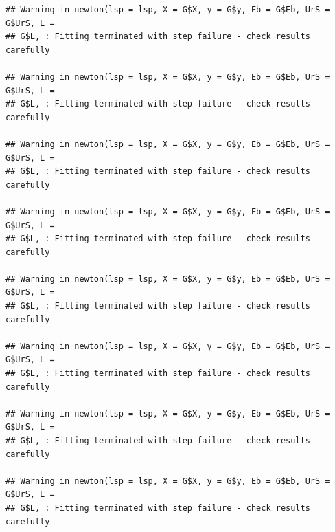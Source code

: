 \documentclass[]{book}
\newenvironment{Shaded}{\begin{snugshade}}{\end{snugshade}}
\newcommand{\KeywordTok}[1]{\textcolor[rgb]{0.13,0.29,0.53}{\textbf{#1}}}
\newcommand{\DataTypeTok}[1]{\textcolor[rgb]{0.13,0.29,0.53}{#1}}
\newcommand{\DecValTok}[1]{\textcolor[rgb]{0.00,0.00,0.81}{#1}}
\newcommand{\StringTok}[1]{\textcolor[rgb]{0.31,0.60,0.02}{#1}}
\newcommand{\OtherTok}[1]{\textcolor[rgb]{0.56,0.35,0.01}{#1}}
\newcommand{\OperatorTok}[1]{\textcolor[rgb]{0.81,0.36,0.00}{\textbf{#1}}}
\newcommand{\NormalTok}[1]{#1}
\theoremstyle{definition}
\theoremstyle{definition}
\theoremstyle{remark}
\begin{document}
\begin{verbatim}
## Warning in newton(lsp = lsp, X = G$X, y = G$y, Eb = G$Eb, UrS = G$UrS, L =
## G$L, : Fitting terminated with step failure - check results carefully

## Warning in newton(lsp = lsp, X = G$X, y = G$y, Eb = G$Eb, UrS = G$UrS, L =
## G$L, : Fitting terminated with step failure - check results carefully

## Warning in newton(lsp = lsp, X = G$X, y = G$y, Eb = G$Eb, UrS = G$UrS, L =
## G$L, : Fitting terminated with step failure - check results carefully

## Warning in newton(lsp = lsp, X = G$X, y = G$y, Eb = G$Eb, UrS = G$UrS, L =
## G$L, : Fitting terminated with step failure - check results carefully

## Warning in newton(lsp = lsp, X = G$X, y = G$y, Eb = G$Eb, UrS = G$UrS, L =
## G$L, : Fitting terminated with step failure - check results carefully

## Warning in newton(lsp = lsp, X = G$X, y = G$y, Eb = G$Eb, UrS = G$UrS, L =
## G$L, : Fitting terminated with step failure - check results carefully

## Warning in newton(lsp = lsp, X = G$X, y = G$y, Eb = G$Eb, UrS = G$UrS, L =
## G$L, : Fitting terminated with step failure - check results carefully

## Warning in newton(lsp = lsp, X = G$X, y = G$y, Eb = G$Eb, UrS = G$UrS, L =
## G$L, : Fitting terminated with step failure - check results carefully
\end{verbatim}

\begin{Shaded}
\end{Shaded}
\end{document}
